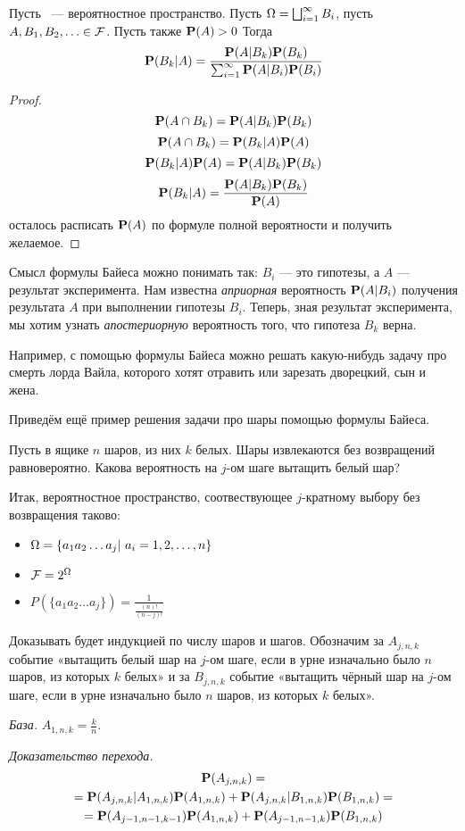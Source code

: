 \begin{theorem}
Пусть \PSP~--- вероятностное пространство. Пусть $\Omega=\bigsqcup_{i=1}^\infty B_i$, пусть $A, B_1, B_2, \ldots \in \mathcal{F}$. Пусть также $\mathbf{P}(A) > 0$ Тогда
$$\mathbf{P}(B_k|A)=\frac{\mathbf{P}(A|B_k)\mathbf{P}(B_k)}{\sum_{i=1}^\infty\mathbf{P}(A|B_i)\mathbf{P}(B_i)}$$
\end{theorem}

\begin{proof}
$$\mathbf{P}(A\cap B_k) = \mathbf{P}(A|B_k) \mathbf{P}(B_k)$$
$$\mathbf{P}(A\cap B_k) = \mathbf{P}(B_k|A) \mathbf{P}(A)$$
$$\mathbf{P}(B_k|A) \mathbf{P}(A) = \mathbf{P}(A|B_k) \mathbf{P}(B_k)$$
$$\mathbf{P}(B_k|A) = \frac{\mathbf{P}(A|B_k) \mathbf{P}(B_k)}{\mathbf{P}(A)}$$
осталось расписать $\mathbf{P}(A)$ по формуле полной вероятности и получить желаемое.
\end{proof}

Смысл формулы Байеса можно понимать так: $B_i$ --- это гипотезы, а $A$ --- результат эксперимента. Нам известна {\it априорная} вероятность $\mathbf{P}(A|B_i)$ получения результата $A$ при выполнении гипотезы $B_i$. Теперь, зная результат эксперимента, мы хотим узнать {\it апостериорную} вероятность того, что гипотеза $B_k$ верна.

Например, с помощью формулы Байеса можно решать какую-нибудь задачу про смерть лорда Вайла, которого хотят отравить или зарезать дворецкий, сын и жена.

Приведём ещё пример решения задачи про шары помощью формулы Байеса.
\begin{example}
	Пусть в ящике $n$ шаров, из них $k$ белых. Шары извлекаются без возвращений равновероятно. Какова вероятность на $j$-ом шаге вытащить белый шар?

	Итак, вероятностное пространство, соотвествующее $j$-кратному выбору без возвращения таково:

		\begin{itemize}
		\item $\Omega = \{a_1a_2 \ldots a_j |~a_i = 1, 2, \ldots, n\}$
		\item $\mathcal{F} = 2^{\Omega}$
		\item $P(\{a_1a_2 \ldots a_j\}) = \frac{1}{\frac{(n)!}{(n-j)!}}$
		\end{itemize}

	Доказывать будет индукцией по числу шаров и шагов. Обозначим за $A_{j,n,k}$ событие «вытащить белый шар на $j$-ом шаге, если в урне изначально было $n$ шаров, из которых $k$ белых» и за $B_{j,n,k}$ событие «вытащить чёрный шар на $j$-ом шаге, если в урне изначально было $n$ шаров, из которых $k$ белых».

	{\it База.} $A_{1,n,k}=\frac{k}{n}$.
	
	{\it Доказательство перехода.} 
	\begin{multline}
	\mathbf{P}(A_{j,n,k}) = \\
	 = \mathbf{P}(A_{j,n,k}|A_{1,n,k})\mathbf{P}(A_{1,n,k}) + \mathbf{P}(A_{j,n,k}|B_{1,n,k})\mathbf{P}(B_{1,n,k}) = \\ 
	 = \mathbf{P}(A_{j-1,n-1,k-1})\mathbf{P}(A_{1,n,k}) + \mathbf{P}(A_{j-1,n-1,k})\mathbf{P}(B_{1,n,k})
	 \end{multline}
\end{example}